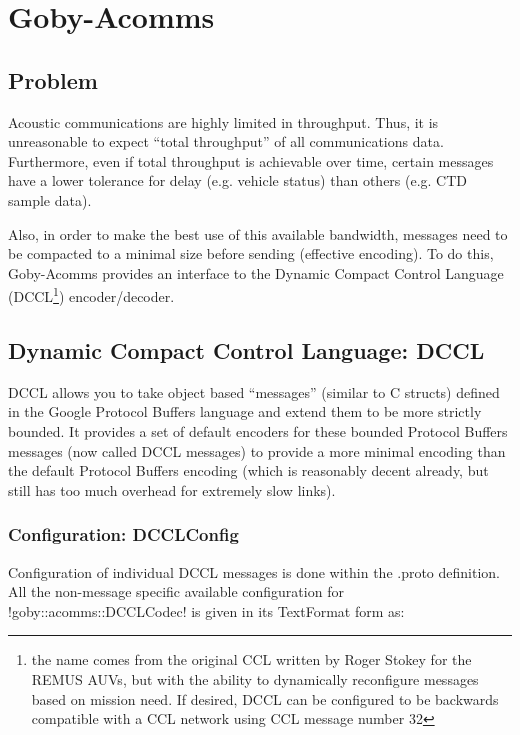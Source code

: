 \chapter{Goby-Acomms}\label{chap:acomms}
\MakeShortVerb{\!} %


\section{Problem}
Acoustic communications are highly limited in throughput. Thus, it is unreasonable to expect ``total throughput'' of all communications data. Furthermore, even if total throughput is achievable over time, certain messages have a lower tolerance for delay (e.g. vehicle status) than others (e.g. CTD sample data). 

Also, in order to make the best use of this available bandwidth, messages need to be compacted to a minimal size before sending (effective encoding). To do this, Goby-Acomms provides an interface to the Dynamic Compact Control Language (DCCL\footnote{the name comes from the original CCL written by Roger Stokey for the REMUS AUVs, but with the ability to dynamically reconfigure messages based on mission need. If desired, DCCL can be configured to be backwards compatible with a CCL network using CCL message number 32}) encoder/decoder. 

\section{Dynamic Compact Control Language: DCCL} \label{sec:dccl}

DCCL allows you to take object based ``messages'' (similar to C structs) defined in the Google Protocol Buffers language and extend them to be more strictly bounded. It provides a set of default encoders for these bounded Protocol Buffers messages (now called DCCL messages) to provide a more minimal encoding than the default Protocol Buffers encoding (which is reasonably decent already, but still has too much overhead for extremely slow links). 

\subsection{Configuration: DCCLConfig}

Configuration of individual DCCL messages is done within the .proto definition. All the non-message specific available configuration for !goby::acomms::DCCLCodec! is given in its TextFormat form as:

